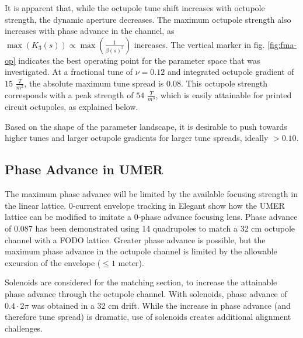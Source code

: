 It is apparent that, while the octupole tune shift increases with octupole strength, the dynamic aperture decreases. 
The maximum octupole strength also increases with phase advance in the channel, as $\max{\left( K_3(s)\right)} \propto \max{\left(\frac{1}{\beta(s)^3}\right)}$ increases. 
The vertical marker in fig. \ref{fig:fma-op} indicates the best operating point for the parameter space that was investigated. 
At a fractional tune of $\nu = 0.12$ and integrated octupole gradient of $15$  $\frac{T}{m^2}$, the absolute maximum tune spread is $0.08$. 
This octupole strength corresponds with a peak strength of $54$  $\frac{T}{m^3}$, which is easily attainable for printed circuit octupoles, as explained below.

Based on the shape of the parameter landscape, it is desirable to push towards higher tunes and larger octupole gradients for larger tune spreads, ideally $> 0.10$.


\subsection{Phase Advance in UMER}

The maximum phase advance will be limited by the available focusing strength in the linear lattice.
0-current envelope tracking in Elegant show how the UMER lattice can be modified to imitate a 0-phase advance focusing lens.\cite{RuisardAAC2014} 
Phase advance of $0.087$ has been demonstrated using 14 quadrupoles to match a 32 cm octupole channel with a FODO lattice. Greater phase advance is possible, but 
the maximum phase advance in the octupole channel is limited by the allowable excursion of the envelope ($\leq1$ meter).

Solenoids are considered for the matching section, to increase the attainable phase advance through the octupole channel. 
With solenoids, phase advance of $0.4\cdot2 \pi$ was obtained in a 32 cm drift. 
While the increase in phase advance (and therefore tune spread) is dramatic, use of solenoids creates additional alignment challenges. 




























